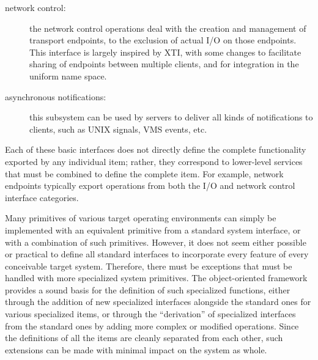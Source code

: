 \begin{description}
\item [network control:] the network control operations deal with the
creation and management of transport endpoints, to the exclusion of
actual I/O on those endpoints.  This interface is largely inspired by
XTI\cite{XTI90}, with some changes to facilitate sharing of endpoints
between multiple clients, and for integration in the uniform name
space.

\item[asynchronous notifications:] this subsystem can be used by
servers to deliver all kinds of notifications to clients, such as UNIX
signals, VMS events, etc.

\end{description}
Each of these basic interfaces does not directly define the complete
functionality exported by any individual item; rather, they correspond
to lower-level services that must be combined to define the complete
item. For example, network endpoints typically export operations from
both the I/O and network control interface categories.

Many primitives of various target operating environments can simply be
implemented with an equivalent primitive from a standard system
interface, or with a combination of such primitives. However, it does
not seem either possible or practical to define all standard
interfaces to incorporate every feature of every conceivable target
system. Therefore, there must be exceptions that must be handled with
more specialized system primitives.  The object-oriented framework
provides a sound basis for the definition of such specialized
functions, either through the addition of new specialized interfaces
alongside the standard ones for various specialized items, or through
the ``derivation'' of specialized interfaces from the standard ones by
adding more complex or modified operations.  Since the definitions of
all the items are cleanly separated from each other, such extensions
can be made with minimal impact on the system as whole.

